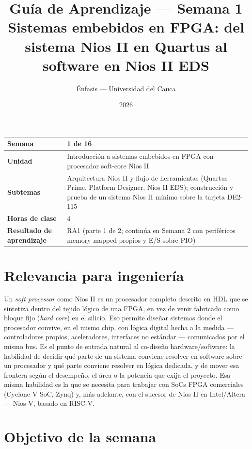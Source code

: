 \documentclass[11pt,letterpaper]{article}
\title{\textcolor{unicaucaverde}{\Large Guía de Aprendizaje --- Semana 1}\\[4pt]
  \large Sistemas embebidos en FPGA: del sistema Nios II en Quartus al software en Nios II EDS}
\author{Énfasis --- Universidad del Cauca}
\date{2026}
\begin{document}
\maketitle

\begin{center}
\begin{tabular}{|>{\bfseries}p{4cm}|p{10cm}|}
\hline
Semana & 1 de 16 \\ \hline
Unidad & Introducción a sistemas embebidos en FPGA con procesador soft-core Nios II \\ \hline
Subtemas & Arquitectura Nios II y flujo de herramientas (Quartus Prime, Platform Designer,
  Nios II EDS); construcción y prueba de un sistema Nios II mínimo sobre la tarjeta DE2-115 \\ \hline
Horas de clase & 4 \\ \hline
Resultado de aprendizaje & RA1 (parte 1 de 2; continúa en Semana 2 con periféricos memory-mapped
  propios y E/S sobre PIO) \\ \hline
\end{tabular}
\end{center}

\section*{Relevancia para ingeniería}

Un \emph{soft processor} como Nios II es un procesador completo descrito en HDL que se sintetiza
dentro del tejido lógico de una FPGA, en vez de venir fabricado como bloque fijo (\emph{hard core})
en el silicio. Eso permite diseñar sistemas donde el procesador convive, en el mismo chip, con
lógica digital hecha a la medida --- controladores propios, aceleradores, interfaces no
estándar --- comunicados por el mismo bus. Es el punto de entrada natural al co-diseño
hardware/software: la habilidad de decidir qué parte de un sistema conviene resolver en software
sobre un procesador y qué parte conviene resolver en lógica dedicada, y de mover esa frontera según
el desempeño, el área o la potencia que exija el proyecto. Esa misma habilidad es la que se necesita
para trabajar con SoCs FPGA comerciales (Cyclone V SoC, Zynq) y, más adelante, con el sucesor de
Nios II en Intel/Altera --- Nios V, basado en RISC-V.

\section{Objetivo de la semana}
\end{document}
